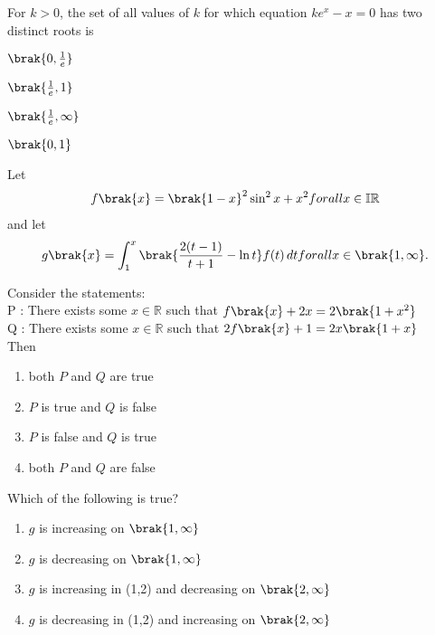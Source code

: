 {\item For $k>0$, the set of all values of $k$ for which equation $ke^x-x=0$ has two distinct roots is 
\hfill {}\\
\begin{enumerate}
    \begin{multicols}{2}
    \item $\brak{0,\frac{1}{e}}$
    \columnbreak
    \item $\brak{\frac{1}{e},1}$
    \end{multicols}
    \begin{multicols}{2}
    \item $\brak{\frac{1}{e},\infty}$
    \item $\brak{0,1}$
    \end{multicols}
\end{enumerate}
}
\item {
Let \begin{align}f\brak{x}=\brak{1-x}^2 \sin^2 x + x^2 for all x \in \mathbb{IR} \end{align} and let \begin{align}g\brak{x}=
\int_{1}^{x} \brak{\frac{2(t-1)}{t+1} - \ln t}  f(t) \, dt for all x \in \brak{1 ,\infty}.\end{align}
\item Consider the statements:\\
P : There exists some $x \in \mathbb{R}$ such that $f\brak{x} + 2x = 2\brak{1+x^2}$\\
Q : There exists some $x \in\mathbb{R}$ such that $2f\brak{x} + 1 = 2x\brak{1+x}$\\
    Then
    \hfill{}
\begin{enumerate}
\item both $P$ and $Q$ are true
\item $P$ is true and $Q$ is false
\item $P$ is false and $Q$ is true
\item both $P$ and $Q$ are false
\end{enumerate}



\item Which of the following is true?
\hfill{}
\begin{enumerate}

\item $g$ is increasing on $\brak{1,\infty}$
\item $g$ is decreasing on $\brak{1,\infty}$
\item $g$ is increasing in (1,2) and decreasing on $\brak{2,\infty}$
\item $g$ is decreasing in (1,2) and increasing on $\brak{2,\infty}$

\end{enumerate}

}
